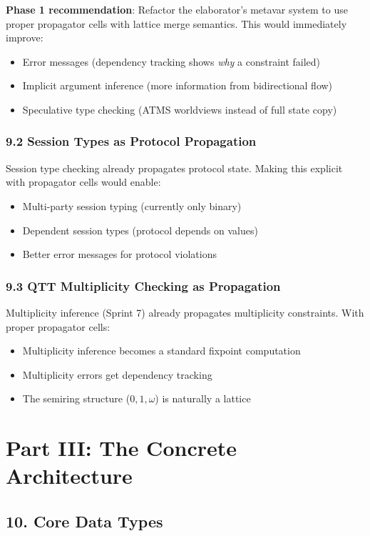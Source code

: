 \documentclass[11pt]{article}
\begin{document}
\textbf{Phase 1 recommendation}: Refactor the elaborator's metavar system to
use proper propagator cells with lattice merge semantics. This would
immediately improve:
\begin{itemize}
\item Error messages (dependency tracking shows \emph{why} a constraint failed)
\item Implicit argument inference (more information from bidirectional flow)
\item Speculative type checking (ATMS worldviews instead of full state copy)
\end{itemize}
\subsubsection{9.2 Session Types as Protocol Propagation}
\label{sec:orgc0c751a}

Session type checking already propagates protocol state. Making this
explicit with propagator cells would enable:
\begin{itemize}
\item Multi-party session typing (currently only binary)
\item Dependent session types (protocol depends on values)
\item Better error messages for protocol violations
\end{itemize}
\subsubsection{9.3 QTT Multiplicity Checking as Propagation}
\label{sec:org8c0a660}

Multiplicity inference (Sprint 7) already propagates multiplicity
constraints. With proper propagator cells:
\begin{itemize}
\item Multiplicity inference becomes a standard fixpoint computation
\item Multiplicity errors get dependency tracking
\item The semiring structure (\(0, 1, \omega\)) is naturally a lattice
\end{itemize}
\section{Part III: The Concrete Architecture}
\label{sec:org38611d2}

\subsection{10. Core Data Types}
\label{sec:org96ba619}
\end{document}
